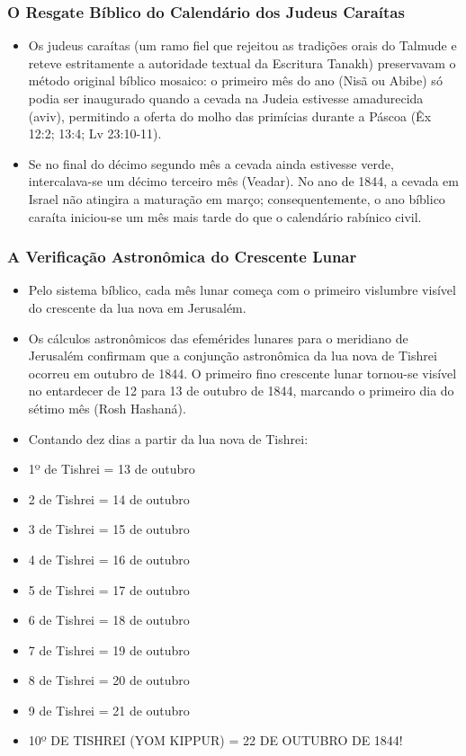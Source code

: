 \subsubsection*{O Resgate Bíblico do Calendário dos Judeus Caraítas}
\begin{itemize}
  \item Os judeus caraítas (um ramo fiel que rejeitou as tradições orais do Talmude e reteve estritamente a autoridade textual da Escritura Tanakh) preservavam o método original bíblico mosaico: o primeiro mês do ano (Nisã ou Abibe) só podia ser inaugurado quando a cevada na Judeia estivesse amadurecida (aviv), permitindo a oferta do molho das primícias durante a Páscoa (Êx 12:2; 13:4; Lv 23:10-11).
  \item Se no final do décimo segundo mês a cevada ainda estivesse verde, intercalava-se um décimo terceiro mês (Veadar). No ano de 1844, a cevada em Israel não atingira a maturação em março; consequentemente, o ano bíblico caraíta iniciou-se um mês mais tarde do que o calendário rabínico civil.
\end{itemize}


\subsubsection*{A Verificação Astronômica do Crescente Lunar}
\begin{itemize}
  \item Pelo sistema bíblico, cada mês lunar começa com o primeiro vislumbre visível do crescente da lua nova em Jerusalém.
  \item Os cálculos astronômicos das efemérides lunares para o meridiano de Jerusalém confirmam que a conjunção astronômica da lua nova de Tishrei ocorreu em outubro de 1844. O primeiro fino crescente lunar tornou-se visível no entardecer de 12 para 13 de outubro de 1844, marcando o primeiro dia do sétimo mês (Rosh Hashaná).
  \item Contando dez dias a partir da lua nova de Tishrei:
  \item 1º de Tishrei = 13 de outubro
  \item 2 de Tishrei = 14 de outubro
  \item 3 de Tishrei = 15 de outubro
  \item 4 de Tishrei = 16 de outubro
  \item 5 de Tishrei = 17 de outubro
  \item 6 de Tishrei = 18 de outubro
  \item 7 de Tishrei = 19 de outubro
  \item 8 de Tishrei = 20 de outubro
  \item 9 de Tishrei = 21 de outubro
  \item 10º DE TISHREI (YOM KIPPUR) = 22 DE OUTUBRO DE 1844!
\end{itemize}


